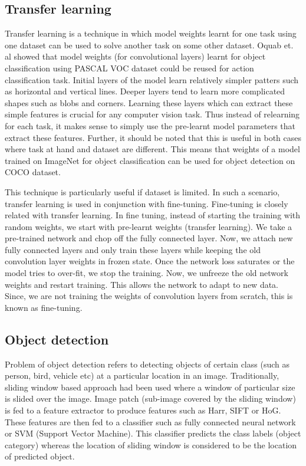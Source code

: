 \subsection{Transfer learning}
Transfer learning is a technique in which model weights learnt for one task using one dataset can be used to solve another task on some other dataset. Oquab et. al\cite{oquab2014learning} showed that model weights (for convolutional layers) learnt for object classification using PASCAL VOC dataset\cite{ref_pascal}  could be reused for action classification task. Initial layers of the model learn relatively simpler patters such as horizontal and vertical lines. Deeper layers tend to learn more complicated shapes such as blobs and corners. Learning these layers which can extract these simple features is crucial for any computer vision task. Thus instead of relearning for each task, it makes sense to simply use the pre-learnt model parameters that extract these features. Further, it should be noted that this is useful in both cases where task at hand and dataset are different. This means that weights of a model trained on ImageNet\cite{ref_imagenet} for object classification can be used for object detection on COCO\cite{ref_coco} dataset.  

This technique is particularly useful if dataset is limited. In such a scenario, transfer learning is used in conjunction with fine-tuning. Fine-tuning is closely related with transfer learning. In fine tuning, instead of starting the training with random weights, we start with pre-learnt weights (transfer learning). We take a pre-trained network and chop off the fully connected layer. Now, we attach new fully connected layers and only train these layers while keeping the old convolution layer weights in frozen state. Once the network loss saturates or the model tries to over-fit, we stop the training. Now, we unfreeze the old network weights and restart training. This allows the network to adapt to new data. Since, we are not training the weights of convolution layers from scratch, this is known as fine-tuning.       


\subsection{Object detection}
Problem of object detection refers to detecting objects of certain class (such as person, bird, vehicle etc) at a particular location in an image. Traditionally, sliding window based approach had been used where a window of particular size is slided over the image. Image patch (sub-image covered by the sliding window) is fed  to a feature extractor to produce features such as Harr\cite{vioda2001rapid}, SIFT\cite{lowe1999object} or HoG\cite{lin2008pose}. These features are then fed to a classifier such as fully connected neural network or SVM (Support Vector Machine). This classifier predicts the class labels (object category) whereas the location of sliding window is considered to be the location of predicted object.

